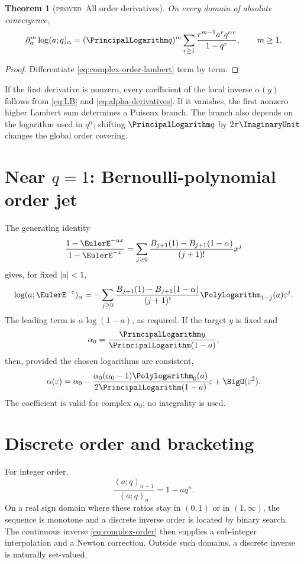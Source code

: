 \documentclass[11pt,letterpaper,oneside,openany]{book}
\newtheorem{theorem}{Theorem}[chapter]
\theoremstyle{definition}
\theoremstyle{remark}
\newcommand{\statusproved}{\textcolor{provedgreen}{\textsc{proved}}}
\begin{document}
\begin{theorem}[\statusproved\ All order derivatives]
On every domain of absolute convergence,
\begin{equation}
 \partial_\alpha^m\log(a;q)_\alpha
 =(\PrincipalLogarithm q)^m\sum_{r\ge1}
 \frac{r^{m-1}a^rq^{\alpha r}}{1-q^r},
 \qquad m\ge1.
 \label{eq:alpha-derivatives}
\end{equation}
\end{theorem}
\begin{proof}
Differentiate \cref{eq:complex-order-lambert} term by term.
\end{proof}

If the first derivative is nonzero, every coefficient of the local inverse
\(\alpha(y)\) follows from \cref{eq:LB} and \cref{eq:alpha-derivatives}.  If it
vanishes, the first nonzero higher Lambert sum determines a Puiseux branch.
The branch also depends on the logarithm used in \(q^\alpha\); shifting
\(\PrincipalLogarithm q\) by \(2\pi\ImaginaryUnit\) changes the global order covering.

\section{Near \(q=1\): Bernoulli-polynomial order jet}
The generating identity
\begin{equation}
 \frac{1-\EulerE^{-\alpha x}}{1-\EulerE^{-x}}
 =\sum_{j\ge0}
 \frac{B_{j+1}(1)-B_{j+1}(1-\alpha)}{(j+1)!}x^j
 \label{eq:bernoulli-ratio}
\end{equation}
gives, for fixed \(|a|<1\),
\begin{equation}
 \log(a;\EulerE^{-\varepsilon})_\alpha
 =-\sum_{j\ge0}
 \frac{B_{j+1}(1)-B_{j+1}(1-\alpha)}{(j+1)!}
 \Polylogarithm_{1-j}(a)\varepsilon^j.
 \label{eq:complex-order-q1}
\end{equation}
The leading term is \(\alpha\log(1-a)\), as required.  If the target \(y\) is
fixed and
\[
 \alpha_0=\frac{\PrincipalLogarithm y}{\PrincipalLogarithm(1-a)},
\]
then, provided the chosen logarithms are consistent,
\begin{equation}
 \alpha(\varepsilon)=\alpha_0-
 \frac{\alpha_0(\alpha_0-1)\Polylogarithm_0(a)}{2\PrincipalLogarithm(1-a)}\varepsilon
 +\BigO(\varepsilon^2).
 \label{eq:alpha-inverse-q1}
\end{equation}
The coefficient is valid for complex \(\alpha_0\); no integrality is used.

\section{Discrete order and bracketing}
For integer order,
\[
 \frac{(a;q)_{n+1}}{(a;q)_n}=1-aq^n.
\]
On a real sign domain where these ratios stay in \((0,1)\) or in
\((1,\infty)\), the sequence is monotone and a discrete inverse order is
located by binary search.  The continuous inverse \cref{eq:complex-order}
then supplies a sub-integer interpolation and a Newton correction.  Outside
such domains, a discrete inverse is naturally set-valued.
\end{document}
